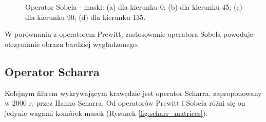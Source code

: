 \documentclass[a4paper,twocolumn,12pt]{article}
\begin{document}
\begin{figure}[!ht]
 \begin{center}
 \end{center}
 \caption{
  Operator Sobela - maski:
  (a) dla kierunku 0\textdegree;
  (b) dla kierunku 45\textdegree;
  (c) dla kierunku 90\textdegree;
  (d) dla kierunku 135\textdegree.
 }
 \label{fig:sobel_matrices}
\end{figure}

W porównaniu z operatorem Prewitt, zastosowanie operatora Sobela powoduje otrzymanie obrazu bardziej wygładzonego.


\subsection{Operator Scharra}

Kolejnym filtrem wykrywającym krawędzie jest operator Scharra, zaproponowany w 2000 r. przez Hanno Scharra.
Od operatorów Prewitt i Sobela różni się on jedynie wagami komórek masek (Rysunek \ref{fig:scharr_matrices}).
\end{document}
